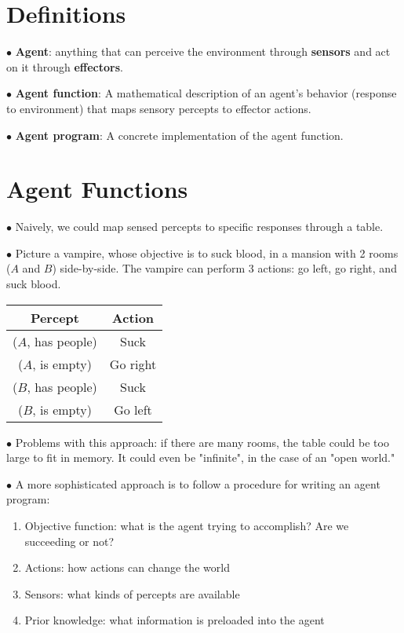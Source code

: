 \documentclass[english,openany]{book}
\begin{document}
    \section{Definitions}
    
    $\bullet$ \textbf{Agent}: anything that can perceive the environment through \textbf{sensors} and act on it through \textbf{effectors}.
    
    $\bullet$ \textbf{Agent function}: A mathematical description of an agent's behavior (response to environment) that maps sensory percepts to effector actions.
    
    $\bullet$ \textbf{Agent program}: A concrete implementation of the agent function.
    
    \section{Agent Functions}
    
    $\bullet$ Naively, we could map sensed percepts to specific responses through a table.
    
    $\bullet$ Picture a vampire, whose objective is to suck blood, in a mansion with 2 rooms ($A$ and $B$) side-by-side. The vampire can perform 3 actions: go left, go right, and suck blood.
    
    \begin{tabular}{|c|c|}
        \hline
        Percept & Action\\
        \hline
        ($A$, has people) & Suck\\
        ($A$, is empty) & Go right\\
        ($B$, has people) & Suck\\
        ($B$, is empty) & Go left\\
        \hline
    \end{tabular}
    
    $\bullet$ Problems with this approach: if there are many rooms, the table could be too large to fit in memory. It could even be "infinite", in the case of an "open world."
    
    $\bullet$ A more sophisticated approach is to follow a procedure for writing an agent program:
    
    \begin{enumerate}
        \item Objective function: what is the agent trying to accomplish? Are we succeeding or not?
        \item Actions: how actions can change the world
        \item Sensors: what kinds of percepts are available
        \item Prior knowledge: what information is preloaded into the agent
    \end{enumerate}
    
\end{document}
